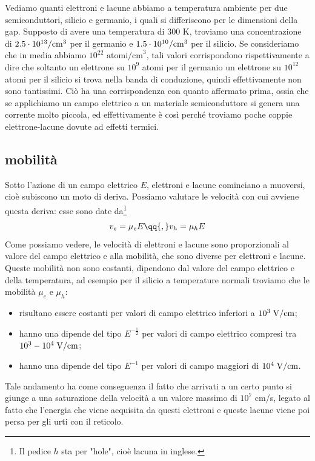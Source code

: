 Vediamo quanti elettroni e lacune abbiamo a temperatura ambiente per due semiconduttori, silicio e germanio, i quali si differiscono per le dimensioni della gap. Supposto di avere una temperatura di 300 K, troviamo una concentrazione di $2.5 \cdot 10^{13}/\rm cm^3$ per il germanio e $1.5 \cdot 10^{10}/\rm cm^3$ per il silicio. Se consideriamo che in media abbiamo $10^{22} \text{ atomi/cm}^3$, tali valori corrispondono rispettivamente a dire che soltanto un elettrone su $10^9$ atomi per il germanio un elettrone su $10^{12}$ atomi per il silicio si trova nella banda di conduzione, quindi effettivamente non sono tantissimi. Ciò ha una corrispondenza con quanto affermato prima, ossia che se applichiamo un campo elettrico a un materiale semiconduttore si genera una corrente molto piccola, ed effettivamente è così perché troviamo poche coppie elettrone-lacune dovute ad effetti termici.
\subsection{mobilità}
Sotto l'azione di un campo elettrico $E$, elettroni e lacune cominciano a muoversi, cioè subiscono un moto di deriva. Possiamo valutare le velocità con cui avviene questa deriva: esse sono date da\footnote{Il pedice $h$ sta per "hole", cioè lacuna in inglese.}
\begin{equation*}
   v_e=\mu_e E
   \qq{,}
   v_h=\mu_h E
\end{equation*}
Come possiamo vedere, le velocità di elettroni e lacune sono proporzionali al valore del campo elettrico e alla mobilità, che sono diverse per elettroni e lacune. Queste mobilità non sono costanti, dipendono dal valore del campo elettrico e della temperatura, ad esempio per il silicio a temperature normali troviamo che le mobilità $\mu_e$ e $\mu_h$:
\begin{itemize}[leftmargin=0.5cm]
   \item risultano essere costanti per valori di campo elettrico inferiori a $10^3 \; \rm V/cm$;
   \item hanno una dipende del tipo $E^{-\frac{1}{2}}$ per valori di campo elettrico compresi tra $10^3-10^4 \; \rm V/cm$;
   \item hanno una dipende del tipo $E^{-1}$ per valori di campo maggiori di $10^4 \; \rm V/cm$.
\end{itemize}
Tale andamento ha come conseguenza il fatto che arrivati a un certo punto si giunge a una saturazione della velocità a un valore massimo di $10^7$ cm/s, legato al fatto che l'energia che viene acquisita da questi elettroni e queste lacune viene poi persa per gli urti con il reticolo.

